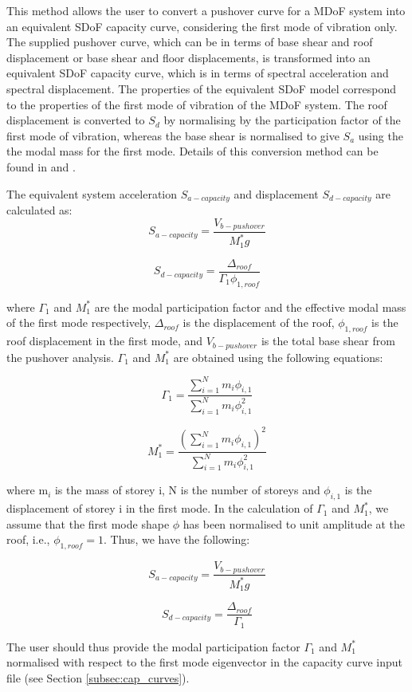 This method allows the user to convert a pushover curve for a MDoF system into an equivalent SDoF capacity curve, considering the first mode of vibration only. The supplied pushover curve, which can be in terms of base shear and roof displacement or base shear and floor displacements, is transformed into an equivalent SDoF capacity curve, which is in terms of spectral acceleration and spectral displacement. The properties of the equivalent SDoF model correspond to the properties of the first mode of vibration of the MDoF system. The roof displacement is converted to $S_d$ by normalising by the participation factor of the first mode of vibration, whereas the base shear is normalised to give $S_a$ using the the modal mass for the first mode. Details of this conversion method can be found in \citet{ATC1996} and \citet{FEMA4402005}.

The equivalent system acceleration $S_{a-capacity}$ and displacement $S_{d-capacity}$ are calculated as:
\begin{equation}
	S_{a-capacity} = \frac{V_{b-pushover}}{M_{1}^{*} g}
\end{equation}

\begin{equation}
	S_{d-capacity} = \frac{\Delta_{roof}}{\Gamma_{1} \phi_{1, roof}}
\end{equation}

where $\Gamma_{1}$ and $M_{1}^{*}$ are the modal participation factor and the effective modal mass of the first mode respectively, $\Delta_{roof}$ is the displacement of the roof, $\phi_{1, roof}$ is the roof displacement in the first mode, and $V_{b-pushover}$ is the total base shear from the pushover analysis. $\Gamma_{1}$ and $M_{1}^{*}$ are obtained using the following equations:

\begin{equation}
	\Gamma_{1} = \frac{\sum_{i=1}^{N} m_i \phi_{i,1}}{\sum_{i=1}^{N} m_i \phi_{i,1}^2}
\end{equation}

\begin{equation}
	M_{1}^{*} = \frac{(\sum_{i=1}^{N} m_i \phi_{i,1})^2}{\sum_{i=1}^{N} m_i \phi_{i,1}^2}
\end{equation}

where m$_i$ is the mass of storey i, N is the number of storeys and $\phi_{i,1}$ is the displacement of storey i in the first mode. In the calculation of $\Gamma_1$ and $M_{1}^{*} $, we assume that the first mode shape $\phi$ has been normalised to unit amplitude at the roof, i.e., $\phi_{1, roof} = 1$. Thus, we have the following:

\begin{equation}
	S_{a-capacity} = \frac{V_{b-pushover}}{M_{1}^{*} g}
\end{equation}

\begin{equation}
	S_{d-capacity} = \frac{\Delta_{roof}}{\Gamma_1}
\end{equation}

The user should thus provide the modal participation factor $\Gamma_1$ and $M_{1}^{*} $ normalised with respect to the first mode eigenvector in the capacity curve input file (see Section \ref{subsec:cap_curves}).